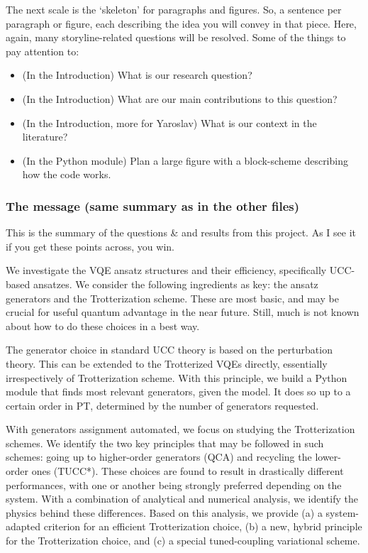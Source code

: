\documentclass[10pt, a4paper]{article}
\begin{document}
The next scale is the `skeleton' for paragraphs and figures. So, a sentence per paragraph or figure, each describing the idea you will convey in that piece. Here, again, many storyline-related questions will be resolved. Some of the things to pay attention to:
\begin{itemize}
\item (In the Introduction) What is our research question?
\item (In the Introduction) What are our main contributions to this question?
\item (In the Introduction, more for Yaroslav) What is our context in the literature?
\item (In the Python module) Plan a large figure with a block-scheme describing how the code works.
\end{itemize}

\subsubsection*{The message (same summary as in the other files)}

This is the summary of the questions \& and results from this project. As I see it if you get these points across, you win.

We investigate the VQE ansatz structures and their efficiency, specifically UCC-based ansatzes. We consider the following ingredients as key: the ansatz generators and the Trotterization scheme. These are most basic, and may be crucial for useful quantum advantage in the near future. Still, much is not known about how to do these choices in a best way.

The generator choice in standard UCC theory is based on the perturbation theory. This can be extended to the Trotterized VQEs directly, essentially irrespectively of Trotterization scheme. With this principle, we build a Python module that finds most relevant generators, given the model. It does so up to a certain order in PT, determined by the number of generators requested.

With generators assignment automated, we focus on studying the Trotterization schemes. We identify the two key principles that may be followed in such schemes: going up to higher-order generators (QCA) and recycling the lower-order ones (TUCC*). These choices are found to result in drastically different performances, with one or another being strongly preferred depending on the system. With a combination of analytical and numerical analysis, we identify the physics behind these differences. Based on this analysis, we provide (a) a system-adapted criterion for an efficient Trotterization choice, (b) a new, hybrid principle for the Trotterization choice, and (c) a special tuned-coupling variational scheme.
\end{document}
